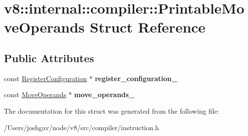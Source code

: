 \hypertarget{structv8_1_1internal_1_1compiler_1_1_printable_move_operands}{}\section{v8\+:\+:internal\+:\+:compiler\+:\+:Printable\+Move\+Operands Struct Reference}
\label{structv8_1_1internal_1_1compiler_1_1_printable_move_operands}
\subsection*{Public Attributes}
\begin{DoxyCompactItemize}
\item 
const \hyperlink{classv8_1_1internal_1_1_register_configuration}{Register\+Configuration} $\ast$ {\bfseries register\+\_\+configuration\+\_\+}\hypertarget{structv8_1_1internal_1_1compiler_1_1_printable_move_operands_a19c3d54d02864cdca542aa550dcec54c}{}\label{structv8_1_1internal_1_1compiler_1_1_printable_move_operands_a19c3d54d02864cdca542aa550dcec54c}

\item 
const \hyperlink{classv8_1_1internal_1_1compiler_1_1_move_operands}{Move\+Operands} $\ast$ {\bfseries move\+\_\+operands\+\_\+}\hypertarget{structv8_1_1internal_1_1compiler_1_1_printable_move_operands_abb02224b7cf69d4d2bd132fd3c2fa230}{}\label{structv8_1_1internal_1_1compiler_1_1_printable_move_operands_abb02224b7cf69d4d2bd132fd3c2fa230}

\end{DoxyCompactItemize}


The documentation for this struct was generated from the following file\+:\begin{DoxyCompactItemize}
\item 
/\+Users/joshgav/node/v8/src/compiler/instruction.\+h\end{DoxyCompactItemize}
